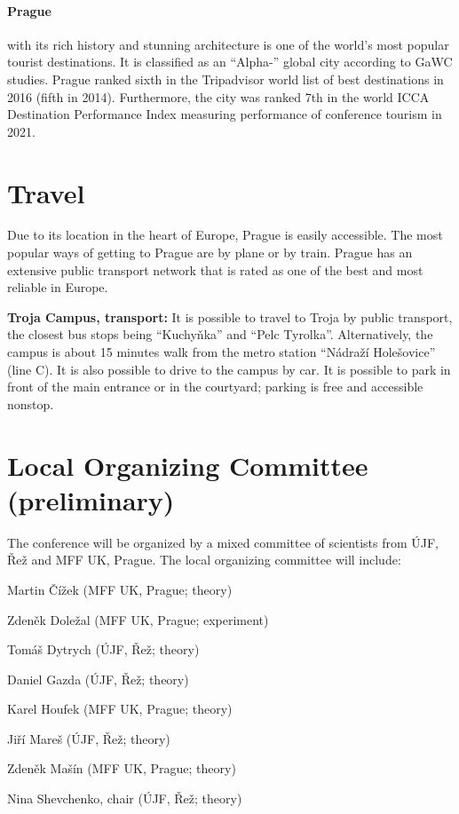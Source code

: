 \documentclass[12pt]{extarticle}
\newcommand{\dg}[1]{\todo[inline]{DG: #1}}
\newcommand*\sq{\mathbin{\vcenter{\hbox{\rule{.8ex}{.8ex}}}}}
\newenvironment{t_sq_itemize}
{\begin{itemize}[topsep=0pt, parsep=0pt, itemsep=0pt, leftmargin=*]
    \renewcommand{\labelitemi}{{\(\sq\)}}}
  {\end{itemize}}
\begin{document}
\paragraph{Prague} with its rich history and stunning architecture is one of the
world's most popular tourist destinations. It is classified as an
``Alpha-{}'' global city according to GaWC studies. Prague ranked sixth
in the Tripadvisor world list of best destinations in 2016 (fifth in
2014). Furthermore, the city was ranked 7th in the world ICCA
Destination Performance Index measuring performance of conference
tourism in 2021.


\section*{Travel}
\noindent
%
Due to its location in the heart of Europe, Prague is easily
accessible. The most popular ways of getting to Prague are by plane or
by train. Prague has an extensive public transport network that is
rated as one of the best and most reliable in Europe.

{\bf Troja Campus, transport:} It is possible to travel to Troja by public transport, the closest bus stops being “Kuchyňka”
and “Pelc Tyrolka”. Alternatively, the campus is about 15 minutes walk from the metro station “Nádraží Holešovice”
(line C). It is also possible to drive to the campus by car. It is possible to park in front of the main entrance or in the courtyard;
parking is free and accessible nonstop.


\section*{Local Organizing Committee (preliminary)}
\noindent
\dg{Exp.\ UOCHB, JH?}
The conference will be organized by a mixed committee of scientists from ÚJF, Řež and MFF UK, Prague.
The local organizing committee will include:
\begin{t_sq_itemize}
\item Martin Čížek (MFF UK, Prague; theory)
\item Zdeněk Doležal (MFF UK, Prague; experiment)
\item Tomáš Dytrych (ÚJF, Řež; theory)
\item Daniel Gazda (ÚJF, Řež; theory)
\item Karel Houfek (MFF UK, Prague; theory)
\item Jiří Mareš (ÚJF, Řež; theory)
\item Zdeněk Mašín (MFF UK, Prague; theory)
\item Nina Shevchenko, chair (ÚJF, Řež; theory)
\end{t_sq_itemize}
\end{document}
